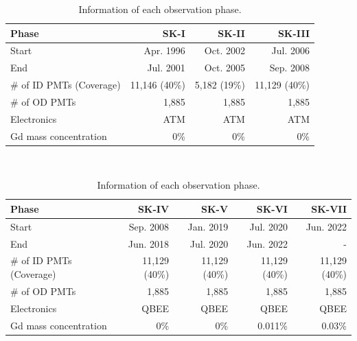 \begin{table}[h]
	\caption[Information of each observation phase]{
	Information of each observation phase.
	}\label{SK_Tab:phase}
	\centering
	\vs
	\begin{tabular}{lrrr} \hline\hline
		Phase                    & SK-I          & SK-II        & SK-III        \\ \hline
		Start                    & Apr. 1996     & Oct. 2002    & Jul. 2006     \\
		End                      & Jul. 2001     & Oct. 2005    & Sep. 2008     \\
		\# of ID PMTs (Coverage) & 11,146 (40\%) & 5,182 (19\%) & 11,129 (40\%) \\
		\# of OD PMTs            & 1,885         & 1,885        & 1,885         \\
		Electronics              & ATM           & ATM          & ATM           \\
		Gd mass concentration    & 0\%           & 0\%          & 0\%           \\ \hline\hline
	\end{tabular}
	\\
	\vs\vs
	\begin{tabular}{lrrrr} \hline\hline
		Phase                    & SK-IV         & SK-V          & SK-VI         & SK-VII        \\ \hline
		Start                    & Sep. 2008     & Jan. 2019     & Jul. 2020     & Jun. 2022     \\
		End                      & Jun. 2018     & Jul. 2020     & Jun. 2022     & -             \\
		\# of ID PMTs (Coverage) & 11,129 (40\%) & 11,129 (40\%) & 11,129 (40\%) & 11,129 (40\%) \\
		\# of OD PMTs            & 1,885         & 1,885         & 1,885         & 1,885         \\
		Electronics              & QBEE          & QBEE          & QBEE          & QBEE          \\
		Gd mass concentration    & 0\%           & 0\%           & 0.011\%       & 0.03\%        \\ \hline\hline
	\end{tabular}
\end{table}





